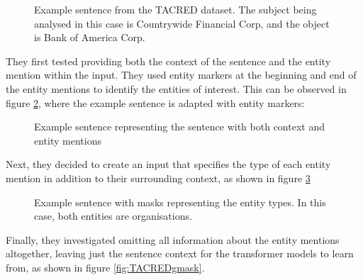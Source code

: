 \documentclass{l4proj}
\begin{document}
\begin{figure}[h]
    \centering
  \caption{Example sentence from the TACRED dataset. The subject being analysed in this case is Countrywide Financial Corp, and the object is Bank of America Corp.}
  \label{fig:TACRED}
\end{figure}

They first tested providing both the context of the sentence and the entity mention within the input. They used entity markers at the beginning and end of the entity mentions to identify the entities of interest. This can be observed in figure \ref{fig:TACREDmark}, where the example sentence is adapted with entity markers:

\begin{figure}[h]
    \centering
  \caption{Example sentence representing the sentence with both context and entity mentions}
  \label{fig:TACREDmark}
\end{figure}

Next, they decided to create an input that specifies the type of each entity mention in addition to their surrounding context, as shown in figure \ref{fig:TACREDsmask}

\begin{figure}[h]
    \centering
  \caption{Example sentence with masks representing the entity types. In this case, both entities are organisations.}
  \label{fig:TACREDsmask}
\end{figure}

Finally, they investigated omitting all information about the entity mentions altogether, leaving just the sentence context for the transformer models to learn from, as shown in figure \ref{fig:TACREDgmask}.
\end{document}
